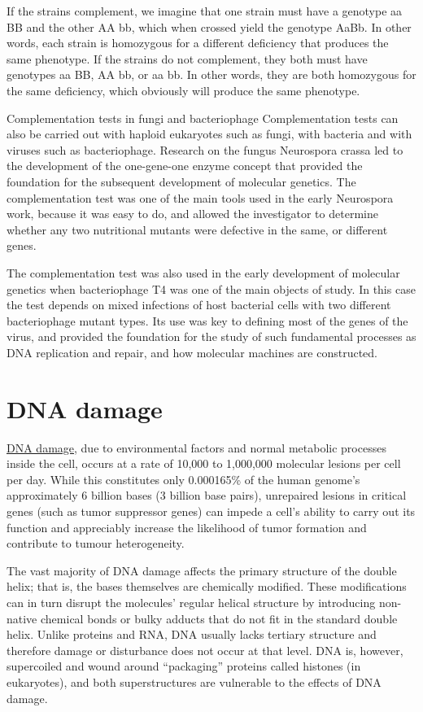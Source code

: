 If the strains complement, we imagine that one strain must have a genotype aa BB and the other AA bb, which when crossed yield the genotype AaBb. In other words, each strain is homozygous for a different deficiency that produces the same phenotype. If the strains do not complement, they both must have genotypes aa BB, AA bb, or aa bb. In other words, they are both homozygous for the same deficiency, which obviously will produce the same phenotype.

Complementation tests in fungi and bacteriophage
Complementation tests can also be carried out with haploid eukaryotes such as fungi, with bacteria and with viruses such as bacteriophage. Research on the fungus Neurospora crassa led to the development of the one-gene-one enzyme concept that provided the foundation for the subsequent development of molecular genetics. The complementation test was one of the main tools used in the early Neurospora work, because it was easy to do, and allowed the investigator to determine whether any two nutritional mutants were defective in the same, or different genes.

The complementation test was also used in the early development of molecular genetics when bacteriophage T4 was one of the main objects of study. In this case the test depends on mixed infections of host bacterial cells with two different bacteriophage mutant types. Its use was key to defining most of the genes of the virus, and provided the foundation for the study of such fundamental processes as DNA replication and repair, and how molecular machines are constructed.

\hypertarget{dna-damage}{%
\section{DNA damage}\label{dna-damage}}

\href{https://en.wikipedia.org/wiki/DNA_damage_(naturally_occurring)}{DNA damage}, due to environmental factors and normal metabolic processes inside the cell, occurs at a rate of 10,000 to 1,000,000 molecular lesions per cell per day. While this constitutes only 0.000165\% of the human genome's approximately 6 billion bases (3 billion base pairs), unrepaired lesions in critical genes (such as tumor suppressor genes) can impede a cell's ability to carry out its function and appreciably increase the likelihood of tumor formation and contribute to tumour heterogeneity.

The vast majority of DNA damage affects the primary structure of the double helix; that is, the bases themselves are chemically modified. These modifications can in turn disrupt the molecules' regular helical structure by introducing non-native chemical bonds or bulky adducts that do not fit in the standard double helix. Unlike proteins and RNA, DNA usually lacks tertiary structure and therefore damage or disturbance does not occur at that level. DNA is, however, supercoiled and wound around ``packaging'' proteins called histones (in eukaryotes), and both superstructures are vulnerable to the effects of DNA damage.

